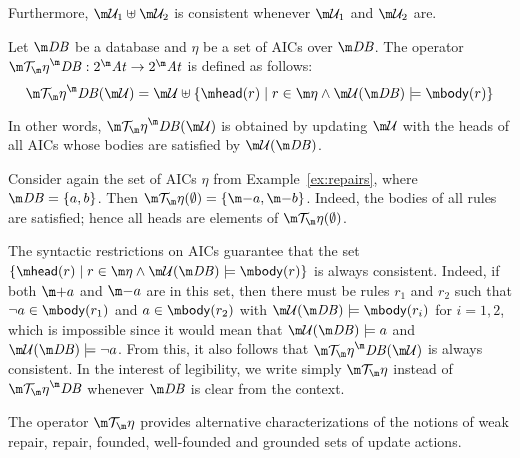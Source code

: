 % 
Furthermore, $\UU_1\uplus\UU_2$ is consistent whenever $\UU_1$ and $\UU_2$ are.
%
\begin{definition}
  Let $\db$ be a database and $\eta$ be a set of AICs over $\db$.
  The operator $\Op^\db:2^\atoms\to 2^\atoms$ is defined as follows:
  \[
    \Op^\db(\UU) = \UU\uplus\{\head(r)\mid r\in \aics \land \UU(\db)\models\body(r)\}
  \]
\end{definition}
In other words, $\Op^\db(\UU)$ is obtained by updating $\UU$ with the heads of all AICs whose bodies are satisfied by $\UU(\db)$.


\begin{example}
  Consider again the set of AICs $\eta$ from Example~\ref{ex:repairs}, where
  $\db=\{a,b\}$.
  Then $\Op(\emptyset)=\{\remove a, \remove b\}$. Indeed, the bodies of all rules are satisfied; hence all heads are elements of $\Op(\emptyset)$.
\end{example}

The syntactic restrictions on AICs guarantee that the set $\{\head(r)\mid r\in \aics \land \UU(\db)\models\body(r)\}$ is always consistent. 
Indeed, if both $\add a$ and $\remove a$ are in this set, then there must be rules $r_1$ and $r_2$ such that $\neg a\in\body(r_1)$ and $a\in\body(r_2)$ with $\UU(\db)\models\body(r_i)$ for $i=1,2$, which is impossible since it would mean that $\UU(\db)\models a$ and $\UU(\db)\models \lnot a$.
From this, it also follows that $\Op^\db(\UU)$ is always consistent. 
In the interest of legibility, we write simply $\Op$ instead of $\Op^\db$ whenever $\db$ is clear from the context.

The operator $\Op$ provides alternative characterizations of the notions of weak repair, repair, founded, well-founded and grounded sets of update actions.



